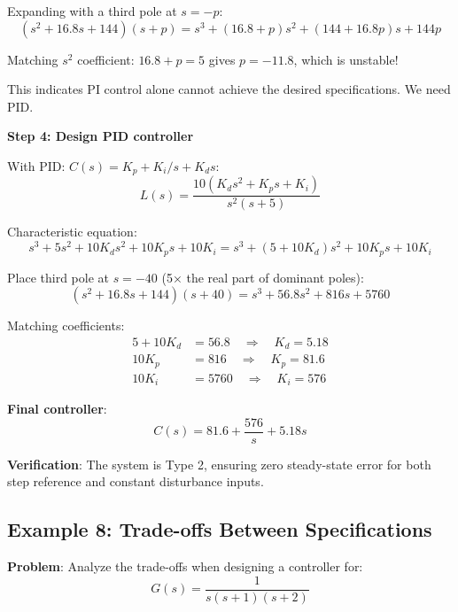 Expanding with a third pole at $s = -p$:
\begin{equation}
    (s^2 + 16.8s + 144)(s + p) = s^3 + (16.8+p)s^2 + (144 + 16.8p)s + 144p
\end{equation}

Matching $s^2$ coefficient: $16.8 + p = 5$ gives $p = -11.8$, which is unstable!

This indicates PI control alone cannot achieve the desired specifications. We need PID.

\textbf{Step 4: Design PID controller}

With PID: $C(s) = K_p + K_i/s + K_d s$:
\begin{equation}
    L(s) = \frac{10(K_d s^2 + K_p s + K_i)}{s^2(s+5)}
\end{equation}

Characteristic equation:
\begin{equation}
    s^3 + 5s^2 + 10K_d s^2 + 10K_p s + 10K_i = s^3 + (5+10K_d)s^2 + 10K_p s + 10K_i
\end{equation}

Place third pole at $s = -40$ (5× the real part of dominant poles):
\begin{equation}
    (s^2 + 16.8s + 144)(s + 40) = s^3 + 56.8s^2 + 816s + 5760
\end{equation}

Matching coefficients:
\begin{align}
    5 + 10K_d &= 56.8 \quad \Rightarrow \quad K_d = 5.18 \\
    10K_p &= 816 \quad \Rightarrow \quad K_p = 81.6 \\
    10K_i &= 5760 \quad \Rightarrow \quad K_i = 576
\end{align}

\textbf{Final controller}:
\begin{equation}
    \boxed{C(s) = 81.6 + \frac{576}{s} + 5.18s}
\end{equation}

\textbf{Verification}: The system is Type 2, ensuring zero steady-state error for both step reference and constant disturbance inputs.

\subsection{Example 8: Trade-offs Between Specifications}

\textbf{Problem}: Analyze the trade-offs when designing a controller for:
\begin{equation}
    G(s) = \frac{1}{s(s+1)(s+2)}
\end{equation}

